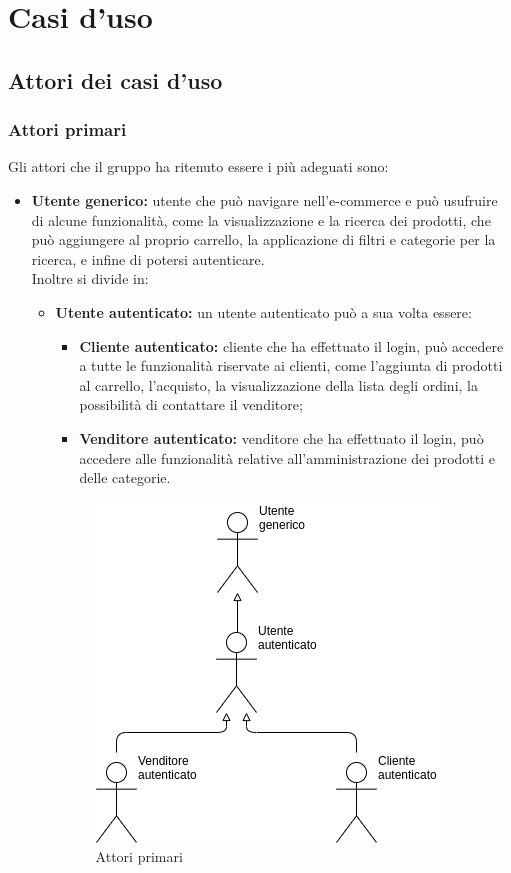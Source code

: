 \section{Casi d'uso}
    \subsection{Attori dei casi d'uso}
    \subsubsection{Attori primari}
    Gli attori che il gruppo ha ritenuto essere i più adeguati sono:
        \begin{itemize}
            \item \textbf{Utente generico:} utente che può navigare nell'e-commerce e può usufruire di alcune funzionalità, come la visualizzazione e la ricerca dei prodotti, che può aggiungere al proprio carrello, la applicazione di filtri e categorie per la ricerca, e infine di potersi autenticare.\\ Inoltre si divide in:
                \begin{itemize}
                    \item \textbf{Utente autenticato:} un utente autenticato può a sua volta essere:
                        \begin{itemize}
                            \item \textbf{Cliente autenticato:} cliente che ha effettuato il login, può accedere a tutte le funzionalità riservate ai clienti, come l'aggiunta di prodotti al carrello, l'acquisto, la visualizzazione della lista degli ordini, la possibilità di contattare il venditore;
                            \item \textbf{Venditore autenticato:} venditore che ha effettuato il login, può accedere alle funzionalità relative all'amministrazione dei prodotti e delle categorie.
                        \end{itemize}
                        \begin{figure}[!ht]
                            \caption{Attori primari}
                            \vspace{5px}
                            \includegraphics[scale=0.6]{../../../Images/AnalisiRequisiti/attori}

\end{figure}
\end{itemize}
\end{itemize}
